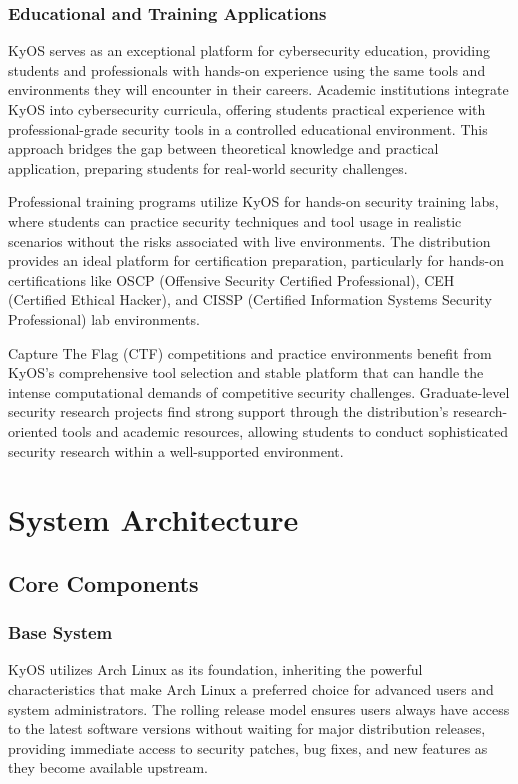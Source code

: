 \documentclass[12pt,a4paper]{article}
\begin{document}
\subsubsection{Educational and Training Applications}
KyOS serves as an exceptional platform for cybersecurity education, providing students and professionals with hands-on experience using the same tools and environments they will encounter in their careers. Academic institutions integrate KyOS into cybersecurity curricula, offering students practical experience with professional-grade security tools in a controlled educational environment. This approach bridges the gap between theoretical knowledge and practical application, preparing students for real-world security challenges.

Professional training programs utilize KyOS for hands-on security training labs, where students can practice security techniques and tool usage in realistic scenarios without the risks associated with live environments. The distribution provides an ideal platform for certification preparation, particularly for hands-on certifications like OSCP (Offensive Security Certified Professional), CEH (Certified Ethical Hacker), and CISSP (Certified Information Systems Security Professional) lab environments.

Capture The Flag (CTF) competitions and practice environments benefit from KyOS's comprehensive tool selection and stable platform that can handle the intense computational demands of competitive security challenges. Graduate-level security research projects find strong support through the distribution's research-oriented tools and academic resources, allowing students to conduct sophisticated security research within a well-supported environment.

\section{System Architecture}

\subsection{Core Components}

\subsubsection{Base System}
KyOS utilizes Arch Linux as its foundation, inheriting the powerful characteristics that make Arch Linux a preferred choice for advanced users and system administrators. The rolling release model ensures users always have access to the latest software versions without waiting for major distribution releases, providing immediate access to security patches, bug fixes, and new features as they become available upstream.
\end{document}
